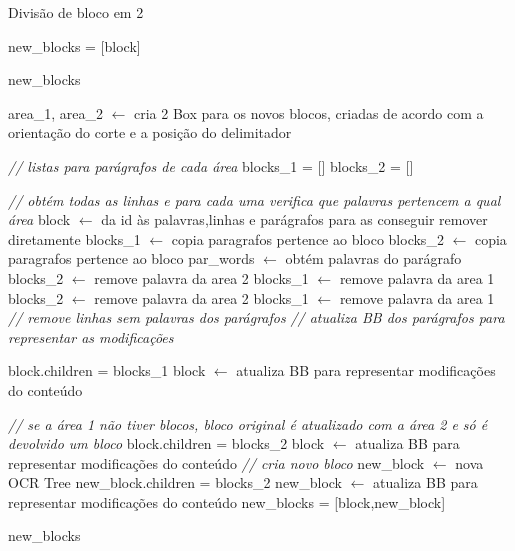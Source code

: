 \begin{breakablealgorithm}
	\caption{Divisão de bloco em 2}
	\footnotesize
	\begin{algorithmic}[1]
		
		\State new\_blocks = [block]
		
			\Return new\_blocks
		\EndIf
		
		\State area\_1, area\_2 $\leftarrow$ cria 2 Box para os novos blocos, criadas de acordo com a orientação do corte e a posição do delimitador
		
		\State \textit{// listas para parágrafos de cada área}
		\State blocks\_1 = []
		\State blocks\_2 = []
		
		\State \textit{// obtém todas as linhas e para cada uma verifica que palavras pertencem a qual área}
		\State block $\leftarrow$ da id às palavras,linhas e parágrafos para as conseguir remover diretamente
		\State blocks\_1 $\leftarrow$ copia paragrafos pertence ao bloco
		\State blocks\_2 $\leftarrow$ copia paragrafos pertence ao bloco
			\State par\_words $\leftarrow$ obtém palavras do parágrafo
					\State blocks\_2 $\leftarrow$ remove palavra da area 2
					\State blocks\_1 $\leftarrow$ remove palavra da area 1
						\State blocks\_2 $\leftarrow$ remove palavra da area 2
					\Else
						\State blocks\_1 $\leftarrow$ remove palavra da area 1
					\EndIf
				\EndIf
			\EndFor
			\State \textit{// remove linhas sem palavras dos parágrafos}
			\State \textit{// atualiza BB dos parágrafos para representar as modificações}
		\EndFor
		
			\State block.children = blocks\_1
			\State block $\leftarrow$ atualiza BB para representar modificações do conteúdo
			
		\Else
			\State \textit{// se a área 1 não tiver blocos, bloco original é atualizado com a área 2 e só é devolvido um bloco}
				\State block.children = blocks\_2
				\State block $\leftarrow$ atualiza BB para representar modificações do conteúdo
			\Else
				\State \textit{// cria novo bloco}
				\State new\_block $\leftarrow$ nova OCR Tree
				\State new\_block.children = blocks\_2
				\State new\_block $\leftarrow$ atualiza BB para representar modificações do conteúdo
				\State new\_blocks = [block,new\_block]
				
			\EndIf
			
		\EndIf
		
		\Return new\_blocks
		
	\end{algorithmic}
\end{breakablealgorithm}


